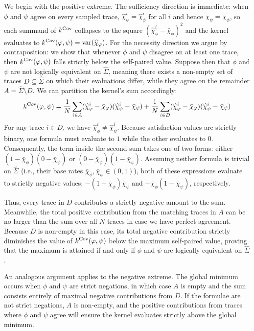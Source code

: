 \documentclass[titlepage,a4paper,11pt]{report}
\begin{document}
    We begin with the positive extreme. The sufficiency direction is immediate: when $\phi$ and $\psi$ agree on every sampled trace, $\widehat\chi^i_\psi = \widehat\chi^i_\phi$ for all $i$ and hence $\bar\chi_\psi = \bar\chi_\phi$, so each summand of $k^{\mathrm{Cov}}$ collapses to the square $(\widehat\chi^i_\phi - \bar\chi_\phi)^2$ and the kernel evaluates to $k^{\mathrm{Cov}}(\varphi, \psi) = \operatorname{var}(\widehat\chi_\varphi)$. For the necessity direction we argue by contraposition: we show that whenever $\phi$ and $\psi$ disagree on at least one trace, then $k^{\mathrm{Cov}}(\varphi, \psi)$ falls strictly below the self-paired value. Suppose then that $\phi$ and $\psi$ are not logically equivalent on $\widehat\Sigma$, meaning there exists a non-empty set of traces $D \subseteq \widehat\Sigma$ on which their evaluations differ, while they agree on the remainder $A = \widehat\Sigma \setminus D$. We can partition the kernel's sum accordingly:
    \begin{equation}
        k^{\mathrm{Cov}}(\varphi, \psi) = \frac{1}{N} \sum_{i \in A} (\widehat{\chi}^i_\varphi - \bar{\chi}_\varphi) (\widehat{\chi}^i_\psi - \bar{\chi}_\psi) + \frac{1}{N} \sum_{i \in D} (\widehat{\chi}^i_\varphi - \bar{\chi}_\varphi) (\widehat{\chi}^i_\psi - \bar{\chi}_\psi)
    \end{equation}
    For any trace $i \in D$, we have $\widehat\chi^i_\phi \neq \widehat\chi^i_\psi$. Because satisfaction values are strictly binary, one formula must evaluate to $1$ while the other evaluates to $0$. Consequently, the term inside the second sum takes one of two forms: either $(1 - \bar\chi_\phi)(0 - \bar\chi_\psi)$ or $(0 - \bar\chi_\phi)(1 - \bar\chi_\psi)$. Assuming neither formula is trivial on $\widehat\Sigma$ (i.e., their base rates $\bar\chi_\phi, \bar\chi_\psi \in (0, 1)$), both of these expressions evaluate to strictly negative values: $-(1 - \bar\chi_\phi)\bar\chi_\psi$ and $-\bar\chi_\phi(1 - \bar\chi_\psi)$, respectively. 
    
    Thus, every trace in $D$ contributes a strictly negative amount to the sum. Meanwhile, the total positive contribution from the matching traces in $A$ can be no larger than the sum over all $N$ traces in case we have perfect agreement. Because $D$ is non-empty in this case, its total negative contribution strictly diminishes the value of $k^{\mathrm{Cov}}(\varphi, \psi)$ below the maximum self-paired value, proving that the maximum is attained if and only if $\phi$ and $\psi$ are logically equivalent on $\widehat\Sigma$.
    
    An analogous argument applies to the negative extreme. The global minimum occurs when $\phi$ and $\psi$ are strict negations, in which case $A$ is empty and the sum consists entirely of maximal negative contributions from $D$. If the formulae are not strict negations, $A$ is non-empty, and the positive contributions from traces where $\phi$ and $\psi$ agree will ensure the kernel evaluates strictly above the global minimum.
\end{document}
